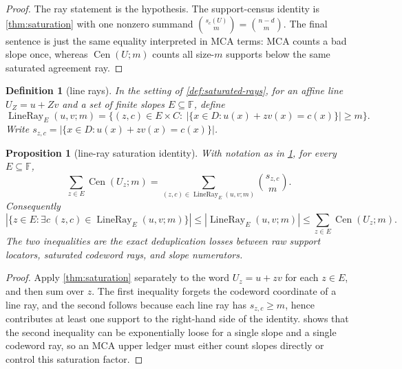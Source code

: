 \documentclass[a4paper,11pt]{amsart}
\newtheorem{proposition}[proposition]{Proposition}
\newtheorem{definition}[definition]{Definition}
\theoremstyle{remark}
\newcommand{\F}{\mathbb F}
\newcommand{\Cen}{\operatorname{Cen}}
\newcommand{\LineRay}{\operatorname{LineRay}}
\begin{document}
\begin{proof}
The ray statement is the hypothesis.  The support-census identity is \cref{thm:saturation} with one nonzero summand \(\binom{s_c(U)}m=\binom{n-d}m\).  The final sentence is just the same equality interpreted in MCA terms: MCA counts a bad slope once, whereas \(\Cen(U;m)\) counts all size-\(m\) supports below the same saturated agreement ray.
\end{proof}

\begin{definition}[line rays]\label{def:line-rays}
In the setting of \cref{def:saturated-rays}, for an affine line \(U_Z=u+Zv\) and a set of finite slopes \(E\subseteq\F\), define
\[
        \LineRay_E(u,v;m)
        =
        \{(z,c)\in E\times C:\ |\{x\in D:u(x)+zv(x)=c(x)\}|\ge m\}.
\]
Write \(s_{z,c}=|\{x\in D:u(x)+zv(x)=c(x)\}|\).
\end{definition}

\begin{proposition}[line-ray saturation identity]\label{prop:line-ray-saturation}
With notation as in \cref{def:line-rays}, for every \(E\subseteq\F\),
\[
        \sum_{z\in E}\Cen(U_z;m)
        =
        \sum_{(z,c)\in\LineRay_E(u,v;m)}\binom{s_{z,c}}m .
\]
Consequently
\[
        |\{z\in E:\exists c\ (z,c)\in\LineRay_E(u,v;m)\}|
        \le
        |\LineRay_E(u,v;m)|
        \le
        \sum_{z\in E}\Cen(U_z;m).
\]
The two inequalities are the exact deduplication losses between raw support locators, saturated codeword rays, and slope numerators.
\end{proposition}

\begin{proof}
Apply \cref{thm:saturation} separately to the word \(U_z=u+zv\) for each \(z\in E\), and then sum over \(z\).  The first inequality forgets the codeword coordinate of a line ray, and the second follows because each line ray has \(s_{z,c}\ge m\), hence contributes at least one support to the right-hand side of the identity.   shows that the second inequality can be exponentially loose for a single slope and a single codeword ray, so an MCA upper ledger must either count slopes directly or control this saturation factor.
\end{proof}
\end{document}
